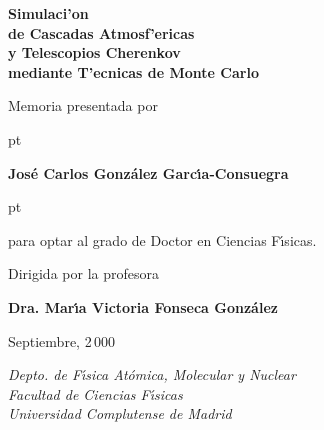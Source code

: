 %



\def\mititulo{%
Simulaci'on \\%
de Cascadas Atmosf'ericas \\%
y Telescopios Cherenkov \\%
mediante T'ecnicas de Monte Carlo\\}

\thispagestyle{empty}  

\mbox{}

\vskip 50pt

\begin{center}

{\Huge \sffamily \bfseries \sc \mititulo}

\vskip 80pt

{
\large \itshape

Memoria presentada por

 pt

{\Large \bfseries \rm Jos{\'{e}} Carlos Gonz{\'{a}}lez Garc{\'{\i}}a-Consuegra}

 pt

para optar al grado de Doctor en Ciencias F{\'{\i}}sicas.

\vskip 40pt

Dirigida por la profesora

\vskip 25pt

{\Large \bfseries \rm Dra. Mar{\'{\i}}a Victoria Fonseca Gonz{\'{a}}lez}

}

\vskip 45pt

{\Large \rm Septiembre, 2\,000 \\}

\vskip 45pt

{\it \small
Depto. de F{\'{\i}}sica At{\'{o}}mica, Molecular y Nuclear\\
Facultad de Ciencias F{\'{\i}}sicas\\
Universidad Complutense de Madrid\\
} 

\end{center}

